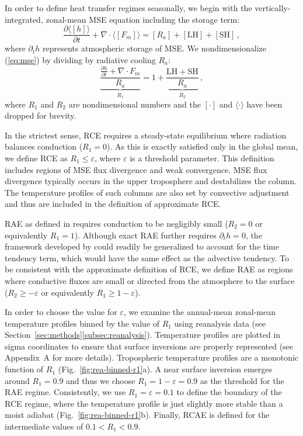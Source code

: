 \documentclass{ametsocV5}
\begin{document}
    In order to define heat transfer regimes seasonally, we begin with the vertically-integrated, zonal-mean MSE equation including the storage term:
    \begin{equation} \label{eq:mse}
        \frac{\partial \langle [h] \rangle}{\partial t} + \nabla\cdot \langle [F_{m}]\rangle = [R_{a}] + \mathrm{[LH]+[SH]} \, ,
    \end{equation}
    where $\partial_t h$ represents atmospheric storage of MSE. We nondimensionalize (\ref{eq:mse}) by dividing by radiative cooling $R_a$:
    \begin{equation}
        {\underbrace{\frac{\frac{\partial h }{\partial t} + \nabla\cdot F_{m}}{R_{a}}}_{R_1}} = 1 + {\underbrace{\frac{\mathrm{LH+SH}}{R_{a}}}_{R_2}} \, ,
    \end{equation}
    where $R_1$ and $R_2$ are nondimensional numbers and the $[\cdot]$ and $\langle\cdot\rangle$ have been dropped for brevity. 
    
    In the strictest sense, RCE requires a steady-state equilibrium where radiation balances conduction (\(R_{1}=0\)). As this is exactly satisfied only in the global mean, we define RCE as \(R_{1}\le \varepsilon\), where $\varepsilon$ is a threshold parameter. This definition includes regions of MSE flux divergence and weak convergence. MSE flux divergence typically occurs in the upper troposphere and destabilizes the column. The temperature profiles of such columns are also set by convective adjustment \citep{warren2020} and thus are included in the definition of approximate RCE.
    
    RAE as defined in \cite{cronin2016} requires conduction to be negligibly small (\(R_{2}=0\) or equivalently \(R_{1}=1\)). Although exact RAE further requires $\partial_t h=0$, the framework developed by \cite{cronin2016} could readily be generalized to account for the time tendency term, which would have the same effect as the advective tendency. To be consistent with the approximate definition of RCE, we define RAE as regions where conductive fluxes are small or directed from the atmosphere to the surface (\(R_{2} \ge -\varepsilon \) or equivalently \(R_{1} \ge 1-\varepsilon\)).
      
    In order to choose the value for $\varepsilon$, we examine the annual-mean zonal-mean temperature profiles binned by the value of $R_1$ using reanalysis data (see Section~\ref{sec:methods}\ref{subsec:reanalysis}). Temperature profiles are plotted in sigma coordinates to ensure that surface inversions are properly represented (see Appendix~A for more details). Tropospheric temperature profiles are a monotonic function of $R_1$ (Fig.~\ref{fig:rea-binned-r1}a). A near surface inversion emerges around $R_1=0.9$ and thus we choose $R_1=1-\varepsilon=0.9$ as the threshold for the RAE regime. Consistently, we use $R_1=\varepsilon=0.1$ to define the boundary of the RCE regime, where the temperature profile is just slightly more stable than a moist adiabat (Fig.~\ref{fig:rea-binned-r1}b). Finally, RCAE is defined for the intermediate values of $0.1<R_1<0.9$.
    
\end{document}
